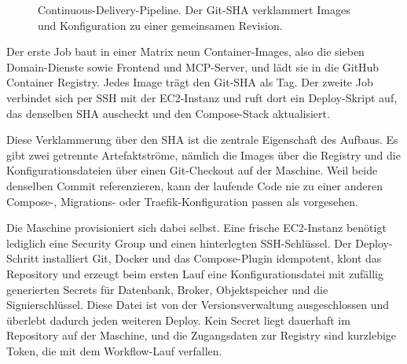 \begin{figure}[ht]
  \centering
  \caption{Continuous-Delivery-Pipeline. Der Git-SHA verklammert Images und Konfiguration zu einer gemeinsamen Revision.}
  \label{fig:cicd-pipeline}
\end{figure}

Der erste Job baut in einer Matrix neun Container-Images, also die sieben Domain-Dienste sowie Frontend und MCP-Server, und lädt sie in die GitHub Container Registry. Jedes Image trägt den Git-SHA als Tag. Der zweite Job verbindet sich per SSH mit der EC2-Instanz und ruft dort ein Deploy-Skript auf, das denselben SHA auscheckt und den Compose-Stack aktualisiert.

Diese Verklammerung über den SHA ist die zentrale Eigenschaft des Aufbaus. Es gibt zwei getrennte Artefaktströme, nämlich die Images über die Registry und die Konfigurationsdateien über einen Git-Checkout auf der Maschine. Weil beide denselben Commit referenzieren, kann der laufende Code nie zu einer anderen Compose-, Migrations- oder Traefik-Konfiguration passen als vorgesehen.

Die Maschine provisioniert sich dabei selbst. Eine frische EC2-Instanz benötigt lediglich eine Security Group und einen hinterlegten SSH-Schlüssel. Der Deploy-Schritt installiert Git, Docker und das Compose-Plugin idempotent, klont das Repository und erzeugt beim ersten Lauf eine Konfigurationsdatei mit zufällig generierten Secrets für Datenbank, Broker, Objektspeicher und die Signierschlüssel. Diese Datei ist von der Versionsverwaltung ausgeschlossen und überlebt dadurch jeden weiteren Deploy. Kein Secret liegt dauerhaft im Repository auf der Maschine, und die Zugangsdaten zur Registry sind kurzlebige Token, die mit dem Workflow-Lauf verfallen.

